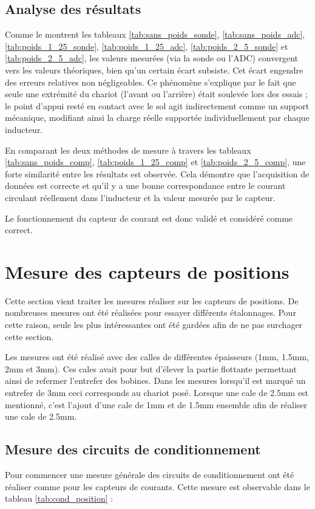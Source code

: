 \subsection{Analyse des résultats}
Comme le montrent les tableaux \ref{tab:sans_poids_sonde}, \ref{tab:sans_poids_adc}, \ref{tab:poids_1_25_sonde}, \ref{tab:poids_1_25_adc}, \ref{tab:poids_2_5_sonde} et \ref{tab:poids_2_5_adc}, les valeurs mesurées (via la sonde ou l'ADC) convergent vers les valeurs théoriques, bien qu'un certain écart subsiste. Cet écart engendre des erreurs relatives non négligeables. Ce phénomène s'explique par le fait que seule une extrémité du chariot (l'avant ou l'arrière) était soulevée lors des essais ; le point d'appui resté en contact avec le sol agit indirectement comme un support mécanique, modifiant ainsi la charge réelle supportée individuellement par chaque inducteur.

En comparant les deux méthodes de mesure à travers les tableaux \ref{tab:sans_poids_comp}, \ref{tab:poids_1_25_comp} et \ref{tab:poids_2_5_comp}, une forte similarité entre les résultats est observée. Cela démontre que l'acquisition de données est correcte et qu'il y a une bonne correspondance entre le courant circulant réellement dans l'inducteur et la valeur mesurée par le capteur.

Le fonctionnement du capteur de courant est donc validé et considéré comme correct.

\section{Mesure des capteurs de positions}
Cette section vient traiter les mesures réaliser sur les capteurs de positions. De nombreuses mesures ont été réalisées pour essayer différents étalonnages. Pour cette raison, seule les plus intéressantes ont été gardées afin de ne pas surchager cette section.

Les mesures ont été réalisé avec des calles de différentes épaisseurs (1mm, 1.5mm, 2mm et 3mm). Ces cales avait pour but d'élever la partie flottante permettant ainsi de refermer l'entrefer des bobines. Dans les mesures lorsqu'il est marqué un entrefer de 3mm ceci corresponds au chariot posé. Lorsque une cale de 2.5mm est mentionné, c'est l'ajout d'une cale de 1mm et de 1.5mm ensemble afin de réaliser une cale de 2.5mm.

\subsection{Mesure des circuits de conditionnement}
Pour commencer une mesure générale des circuits de conditionnement ont été réaliser comme pour les capteurs de courants. Cette mesure est observable dans le tableau \ref{tab:cond_position} :

